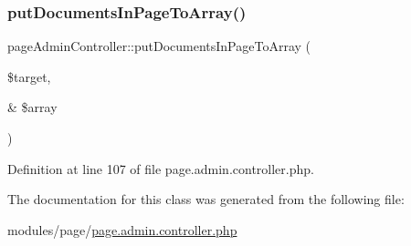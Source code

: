 \subsubsection{\texorpdfstring{put\+Documents\+In\+Page\+To\+Array()}{putDocumentsInPageToArray()}}
{\footnotesize\ttfamily page\+Admin\+Controller\+::put\+Documents\+In\+Page\+To\+Array (\begin{DoxyParamCaption}\item[{}]{\$target,  }\item[{\&}]{\$array }\end{DoxyParamCaption})}



Definition at line 107 of file page.\+admin.\+controller.\+php.



The documentation for this class was generated from the following file\+:\begin{DoxyCompactItemize}
\item 
modules/page/\hyperlink{page_8admin_8controller_8php}{page.\+admin.\+controller.\+php}\end{DoxyCompactItemize}
